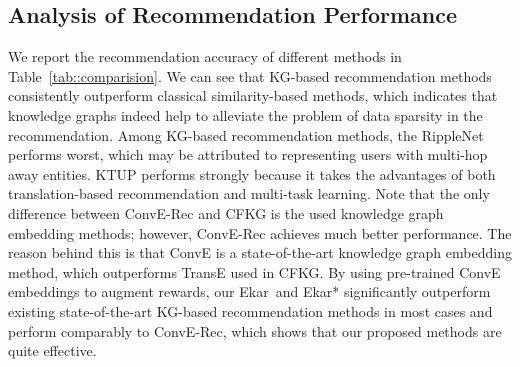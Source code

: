\documentclass{article}
\newcommand{\name}{Ekar}
\begin{document}
\subsection{Analysis of Recommendation Performance}
We report the recommendation accuracy of different methods in Table~\ref{tab::comparision}. We can see that KG-based recommendation methods consistently outperform classical similarity-based methods, which indicates that knowledge graphs indeed help to alleviate the problem of data sparsity in the recommendation. Among KG-based recommendation methods, the RippleNet performs worst, which may be attributed to representing users with multi-hop away entities. KTUP performs strongly because it takes the advantages of both translation-based recommendation and multi-task learning. Note that the only difference between ConvE-Rec and CFKG is the used knowledge graph embedding methods; however, ConvE-Rec achieves much better performance. The reason behind this is that ConvE is a state-of-the-art knowledge graph embedding method, which outperforms TransE used in CFKG. By using pre-trained ConvE embeddings to augment rewards, our \name\ and \name* significantly outperform existing state-of-the-art KG-based recommendation methods in most cases and perform comparably to ConvE-Rec, which shows that our proposed methods are quite effective.  



\begin{figure}
\begin{floatrow}
\end{floatrow}
\vspace{-3pt}
\end{figure}
\end{document}
